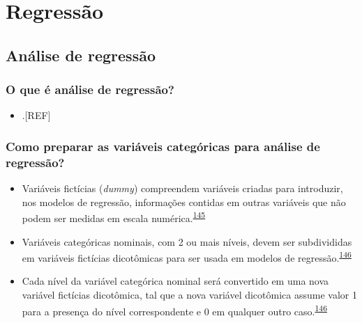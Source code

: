 \documentclass[
]{book}
\providecommand{\tightlist}{%
  \setlength{\itemsep}{0pt}\setlength{\parskip}{0pt}}
\begin{document}
\hypertarget{analise-inferencial-regressao}{%
\chapter{\texorpdfstring{\textbf{Regressão}}{Regressão}}\label{analise-inferencial-regressao}}

\hypertarget{analise-regressao}{%
\section{Análise de regressão}\label{analise-regressao}}

\hypertarget{o-que-uxe9-anuxe1lise-de-regressuxe3o}{%
\subsection{O que é análise de regressão?}\label{o-que-uxe9-anuxe1lise-de-regressuxe3o}}

\begin{itemize}
\tightlist
\item
  .{[}REF{]}
\end{itemize}

\hypertarget{como-preparar-as-variuxe1veis-categuxf3ricas-para-anuxe1lise-de-regressuxe3o}{%
\subsection{Como preparar as variáveis categóricas para análise de regressão?}\label{como-preparar-as-variuxe1veis-categuxf3ricas-para-anuxe1lise-de-regressuxe3o}}

\begin{itemize}
\item
  Variáveis fictícias (\emph{dummy}) compreendem variáveis criadas para introduzir, nos modelos de regressão, informações contidas em outras variáveis que não podem ser medidas em escala numérica.\textsuperscript{\protect\hyperlink{ref-suits1957}{145}}
\item
  Variáveis categóricas nominais, com 2 ou mais níveis, devem ser subdivididas em variáveis fictícias dicotômicas para ser usada em modelos de regressão.\textsuperscript{\protect\hyperlink{ref-Healy1995}{146}}
\item
  Cada nível da variável categórica nominal será convertido em uma nova variável fictícias dicotômica, tal que a nova variável dicotômica assume valor 1 para a presença do nível correspondente e 0 em qualquer outro caso.\textsuperscript{\protect\hyperlink{ref-Healy1995}{146}}
\end{itemize}
\end{document}
